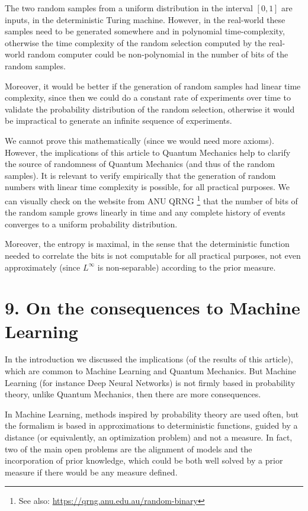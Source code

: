 \documentclass[11pt]{book}
\begin{document}
The two random samples from a uniform distribution in the interval
\([0,1]\) are inputs, in the deterministic Turing machine. However, in
the real-world these samples need to be generated somewhere and in
polynomial time-complexity, otherwise the time complexity of the random
selection computed by the real-world random computer could be
non-polynomial in the number of bits of the random samples.

Moreover, it would be better if the generation of random samples had
linear time complexity, since then we could do a constant rate of
experiments over time to validate the probability distribution of the
random selection, otherwise it would be impractical to generate an
infinite sequence of experiments.

We cannot prove this mathematically (since we would need more axioms).
However, the implications of this article to Quantum Mechanics help to
clarify the source of randomness of Quantum Mechanics (and thus of the
random samples). It is relevant to verify empirically that the
generation of random numbers with linear time complexity is possible,
for all practical purposes. We can visually check on the website from
ANU QRNG \footnote{See also: \url{https://qrng.anu.edu.au/random-binary}}
that the number of bits of the random sample grows linearly in time and
any complete history of events converges to a uniform probability
distribution.

Moreover, the entropy is maximal, in the sense that the deterministic
function needed to correlate the bits is not computable for all
practical purposes, not even approximately (since \(L^\infty\) is
non-separable) according to the prior measure.

\hypertarget{on-the-consequences-to-machine-learning}{%
\section{9. On the consequences to Machine
Learning}\label{on-the-consequences-to-machine-learning}}

In the introduction we discussed the implications (of the results of
this article), which are common to Machine Learning and Quantum
Mechanics. But Machine Learning (for instance Deep Neural Networks) is
not firmly based in probability theory, unlike Quantum Mechanics, then
there are more consequences.

In Machine Learning, methods inspired by probability theory are used
often\cite{hennig2022probabilistic}, but the formalism is based in approximations to
deterministic functions, guided by a distance (or equivalently, an
optimization problem) and not a measure. In fact, two of the main open
problems are the alignment of models and the incorporation of prior
knowledge\cite{muller2022transformers}, which could be both well solved by a prior measure if there
would be any measure defined.
\end{document}
